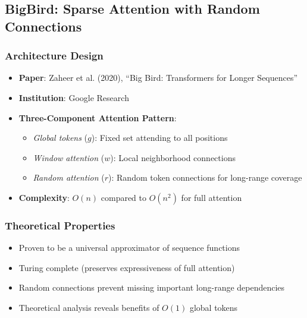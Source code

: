\documentclass[11pt]{article}
\begin{document}
\subsection{BigBird: Sparse Attention with Random Connections}

\subsubsection{Architecture Design}
\begin{itemize}[leftmargin=*]
    \item \textbf{Paper}: Zaheer et al. (2020), ``Big Bird: Transformers for Longer Sequences''~\cite{zaheer2020bigbird}
    \item \textbf{Institution}: Google Research
    \item \textbf{Three-Component Attention Pattern}:
    \begin{itemize}
        \item \textit{Global tokens} ($g$): Fixed set attending to all positions
        \item \textit{Window attention} ($w$): Local neighborhood connections
        \item \textit{Random attention} ($r$): Random token connections for long-range coverage
    \end{itemize}
    \item \textbf{Complexity}: $O(n)$ compared to $O(n^2)$ for full attention
\end{itemize}

\subsubsection{Theoretical Properties}
\begin{itemize}[leftmargin=*]
    \item Proven to be a universal approximator of sequence functions
    \item Turing complete (preserves expressiveness of full attention)
    \item Random connections prevent missing important long-range dependencies
    \item Theoretical analysis reveals benefits of $O(1)$ global tokens
\end{itemize}
\end{document}
